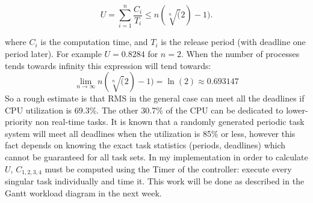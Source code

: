 \begin{equation}
U=\sum_{i=1}^{n}\frac{C_{i}}{T_{i}} \leq n(\sqrt[n](2)-1).
\end{equation}

where $C_{i}$ is the computation time, and $T_{i}$ is the release period (with deadline one period later). For example $U = 0.8284$ for $n = 2$. When the number of processes tends towards infinity this expression will tend towards:
\begin{equation}
\lim_{n \rightarrow \infty} n(\sqrt[n](2)-1)=\ln(2) \approx 0.693147
\end{equation}
So a rough estimate is that RMS in the general case can meet all the deadlines if CPU utilization is 69.3\%. The other 30.7\% of the CPU can be dedicated to lower-priority non real-time tasks. It is known that a randomly generated periodic task system will meet all deadlines when the utilization is 85\% or less, however this fact depends on knowing the exact task statistics (periods, deadlines) which cannot be guaranteed for all task sets.
In my implementation in order to calculate $U$, $C_{1,2,3,4}$ must be computed using the Timer of the controller: execute every singular task individually and time it. This work will be done as described in the Gantt workload diagram in the next week.
